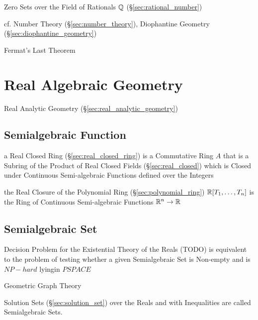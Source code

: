 \begin{itemize}
\begin{itemize}
Zero Sets over the Field of Rationals $\mathbb{Q}$ (\S\ref{sec:rational_number})

cf. Number Theory (\S\ref{sec:number_theory}), Diophantine Geometry
(\S\ref{sec:diophantine_geometry})

Fermat's Last Theorem



\section{Real Algebraic Geometry}\label{sec:real_algebraic_geometry}

Real Analytic Geometry (\S\ref{sec:real_analytic_geometry})



\subsection{Semialgebraic Function}\label{sec:semialgebraic_function}

a Real Closed Ring (\S\ref{sec:real_closed_ring}) is a Commutative Ring $A$
that is a Subring of the Product of Real Closed Fields
(\S\ref{sec:real_closed}) which is Closed under Continuous Semi-algebraic
Functions defined over the Integers

the Real Closure of the Polynomial Ring (\S\ref{sec:polynomial_ring})
$\mathbb{R}[T_1,\ldots,T_n]$ is the Ring of Continuous Semi-algebraic Functions
$\mathbb{R}^n \rightarrow \mathbb{R}$



\subsection{Semialgebraic Set}\label{sec:semialgebraic_set}

Decision Problem for the Existential Theory of the Reals (TODO) is equivalent
to the problem of testing whether a given Semialgebraic Set is Non-empty and is
$NP-hard$ lyingin $PSPACE$

Geometric Graph Theory

Solution Sets (\S\ref{sec:solution_set}) over the Reals and with Inequalities
are called Semialgebraic Sets.




\end{itemize}
\end{itemize}
